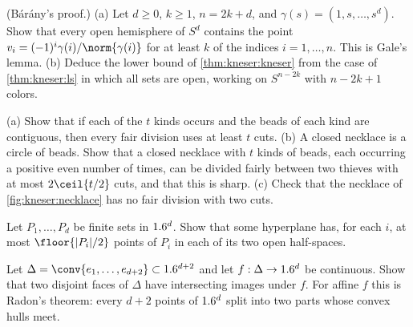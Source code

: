 \begin{refsection}
\begin{exercises}
\item \consolidation\hard\label{ex:kneser:gale} (B{\'a}r{\'a}ny's proof.) (a) Let $d\ge0$, $k\ge1$, $n=2k+d$, and $\gamma(s)=(1,s,\dots,s^d)$. Show that every open hemisphere of $S^d$ contains the point $v_i=(-1)^i\gamma(i)/\norm{\gamma(i)}$ for at least $k$ of the indices $i=1,\dots,n$. This is Gale's lemma. (b) Deduce the lower bound of \cref{thm:kneser:kneser} from the case of \cref{thm:kneser:ls} in which all sets are open, working on $S^{n-2k}$ with $n-2k+1$ colors. 

\item \consolidation\label{ex:kneser:necklace} (a) Show that if each of the $t$ kinds occurs and the beads of each kind are contiguous, then every fair division uses at least $t$ cuts. (b) A closed necklace is a circle of beads. Show that a closed necklace with $t$ kinds of beads, each occurring a positive even number of times, can be divided fairly between two thieves with at most $2\ceil{t/2}$ cuts, and that this is sharp. (c) Check that the necklace of \cref{fig:kneser:necklace} has no fair division with two cuts.

\item \transfer\hard\label{ex:kneser:discreteham} Let $P_1,\dots,P_d$ be finite sets in $1.6^d$. Show that some hyperplane has, for each $i$, at most $\floor{|P_i|/2}$ points of $P_i$ in each of its two open half-spaces. 

\item \transfer\hard\label{ex:kneser:radon} Let $\Delta=\conv\{e_1,\dots,e_{d+2}\}\subset\R^{d+2}$ and let $f:\Delta\to1.6^d$ be continuous. Show that two disjoint faces of $\Delta$ have intersecting images under $f$. For affine $f$ this is Radon's theorem: every $d+2$ points of $1.6^d$ split into two parts whose convex hulls meet. 


\end{exercises}
\end{refsection}
